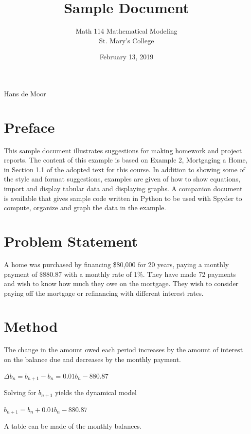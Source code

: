 \documentclass[12pt]{article} %
\title{Sample Document}
\author{Math 114 Mathematical Modeling\\St. Mary's College}
\date{February 13, 2019}
\newcommand{\authors}{Hans de Moor}
\begin{document}
\hfill\authors %
{\let\newpage\relax\maketitle} %

\section*{Preface}
This sample document illustrates suggestions for making homework and project reports. The content of this example is based on Example 2, Mortgaging a Home, in Section 1.1 of the adopted text for this course. In addition to showing some of the style and format suggestions, examples are given of how to show equations, import and display tabular data and displaying graphs. A companion document is available that gives sample code written in Python to be used with Spyder to compute, organize and graph the data in the example.

\section*{Problem Statement}
A home was purchased by financing \$80,000 for 20 years, paying a monthly payment of \$880.87 with a monthly rate of 1\%. They have made 72 payments and wish to know how much they owe on the mortgage. They wish to consider paying off the mortgage or refinancing with different interest rates.

\section*{Method}

The change in the amount owed each period increases by the amount of interest on the balance due and decreases by the monthly payment.

$\Delta b_n = b_{n+1} - b_n = 0.01 b_n - 880.87$

Solving for $b_{n+1}$ yields the dynamical model

$b_{n+1} = b_n + 0.01 b_n - 880.87$

A table can be made of the monthly balances.
\end{document}
